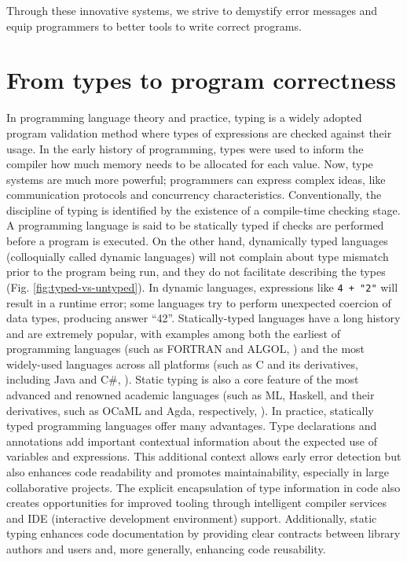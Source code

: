 Through these innovative systems, we strive to demystify error messages and equip programmers to better tools to write correct programs. 

\section{From types to program correctness}

In programming language theory and practice, typing is a widely adopted program validation method where types of expressions are checked against their usage. In the early history of programming, types were used to inform the compiler how much memory needs to be allocated for each value. Now, type systems are much more powerful; programmers can express complex ideas, like communication protocols and concurrency characteristics. Conventionally, the discipline of typing is identified by the existence of a compile-time checking stage. A programming language is said to be statically typed if checks are performed before a program is executed.  On the other hand, dynamically typed languages (colloquially called dynamic languages) will not complain about type mismatch prior to the program being run, and they do not facilitate describing the types (Fig. \ref{fig:typed-vs-untyped}). In dynamic languages, expressions like \texttt{4 + "2"} will result in a runtime error; some languages try to perform unexpected coercion of data types, producing answer ``42''. Statically-typed languages have a long history and are extremely popular, with examples among both the earliest of programming languages (such as FORTRAN and ALGOL, \cite{Backus1978-xt}) and the most widely-used languages across all platforms  (such as C and its derivatives, including Java and C\#, \cite{Ritchie1978-pa}). Static typing is also a core feature of the most advanced and renowned academic languages (such as ML, Haskell, and their derivatives, such as OCaML and Agda, respectively, \cite{Hudak2007-kn}). In practice, statically typed programming languages offer many advantages. Type declarations and annotations add important contextual information about the expected use of variables and expressions. This additional context allows early error detection but also enhances code readability and promotes maintainability, especially in large collaborative projects. The explicit encapsulation of type information in code also creates opportunities for improved tooling through intelligent compiler services and IDE (interactive development environment) support. Additionally, static typing enhances code documentation by providing clear contracts between library authors and users and, more generally, enhancing code reusability.


